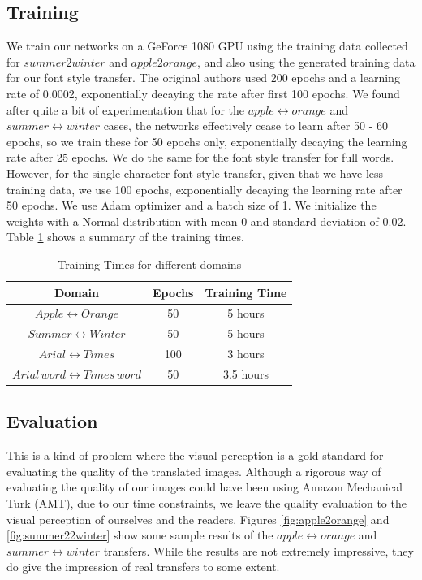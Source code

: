 \documentclass[10pt,twocolumn,letterpaper]{article}
\begin{document}
\subsection{Training}
We train our networks on a GeForce 1080 GPU using the training data collected for $summer2winter$ and $apple2orange$, and also using the generated training data for our
font style transfer. The original authors \cite{cyclegan} used 200 epochs and a learning rate of 0.0002, exponentially decaying the rate after first 100 epochs. We found after 
quite a bit of experimentation that for the $apple \leftrightarrow orange$ and $summer \leftrightarrow winter$ cases, the networks effectively cease to learn after 50 - 60 epochs, so we train these for 50 epochs only, exponentially decaying the learning rate after 25 epochs. We do the same for the font style transfer for full words. However, for the single character font style transfer, given that we have less training data, we use 100 epochs, exponentially decaying the learning rate after 50 epochs. We use Adam optimizer and a batch size of 1. We initialize the weights with a Normal distribution with mean 0 and standard deviation of 0.02. Table \ref{table:train} shows a summary of the training times.

\begin{table}[ht!]  
\begin{center}
\begin{tabular}{ |c|c|c| } 
 \hline
 \textbf{Domain} & \textbf{Epochs} & \textbf{Training Time} \\ 
 \hline
 $Apple \leftrightarrow Orange$ & 50 & 5 hours \\ 
 \hline
 $Summer \leftrightarrow Winter$ & 50 & 5 hours \\ 
 \hline
 $Arial \leftrightarrow Times$ & 100 & 3 hours \\ 
 \hline
 $Arial \, word\leftrightarrow Times \, word$ & 50 & 3.5 hours \\ 
 \hline
\end{tabular}
\end{center}
\caption{Training Times for different domains}
\label{table:train}
\end{table}

\subsection{Evaluation}
This is a kind of problem where the visual perception is a gold standard for
evaluating the quality of the translated images. Although a rigorous way of evaluating the quality of our images could have been using 
Amazon Mechanical Turk (AMT), due to our time constraints, we leave the quality
evaluation to the visual perception of ourselves and the readers. Figures 
\ref{fig:apple2orange} and \ref{fig:summer22winter} show some sample results of 
the $apple \leftrightarrow orange$ and $summer \leftrightarrow winter$ transfers. While 
the results are not extremely impressive, they do give the impression of real transfers to some extent.
\end{document}
